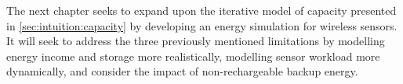 The next chapter seeks to expand upon the iterative model of capacity presented in \cref{sec:intuition:capacity} by developing an energy simulation for wireless sensors.
It will seek to address the three previously mentioned limitations by modelling energy income and storage more realistically, modelling sensor workload more dynamically, and consider the impact of non-rechargeable backup energy.

%
%
%
%
%
%
%
%
%
%
%
%
%
%
%
%
%
%
%
%
%


